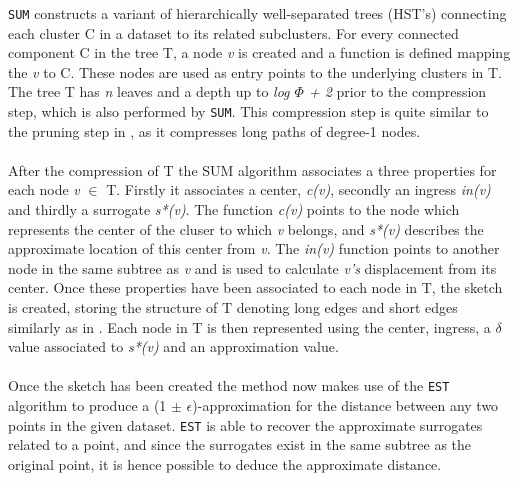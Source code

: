 \texttt{SUM} constructs a variant of hierarchically well-separated trees (HST's) connecting each cluster C in a dataset to its related subclusters. For every connected component C in the tree T, a node \textit{v} is created and a function is defined mapping the \textit{v} to C. These nodes are used as entry points to the underlying clusters in T. The tree T has \textit{n} leaves and a depth up to \textit{log $\Phi$ + 2} prior to the compression step, which is also performed by \texttt{SUM}. This compression step is quite similar to the pruning step in \cite{wagner17}, as it compresses long paths of degree-1 nodes.
\\
\\
After the compression of T the SUM algorithm associates a three properties for each node \textit{v} $\in$ T. Firstly it associates a center, \textit{c(v)}, secondly an ingress \textit{in(v)} and thirdly a surrogate \textit{s*(v)}. The function \textit{c(v)} points to the node which represents the center of the cluser to which \textit{v} belongs, and \textit{s*(v)} describes the approximate location of this center from \textit{v}. The \textit{in(v)} function points to another node in the same subtree as \textit{v} and is used to calculate \textit{v's} displacement from its center. Once these properties have been associated to each node in T, the sketch is created, storing the structure of T denoting long edges and short edges similarly as in \qs{}. Each node in T is then represented using the center, ingress, a $\delta$ value associated to \textit{s*(v)} and an approximation value. 
\\
\\
Once the sketch has been created the method now makes use of the \texttt{EST} algorithm to produce a (1 $\pm$ $\epsilon$)-approximation for the distance between any two points in the given dataset. \texttt{EST} is able to recover the approximate surrogates related to a point, and since the surrogates exist in the same subtree as the original point, it is hence possible to deduce the approximate distance. 
